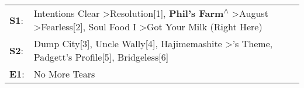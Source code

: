\begin{supertabular}{p{0.03\textwidth}p{0.92\textwidth}}
 \textbf{S1}:  &  Intentions Clear\textsuperscript{} \textgreater \enspace Resolution[1]\textsuperscript{}, \enspace \textbf{Phil's Farm\textsuperscript{$\wedge$}} \textgreater \enspace August\textsuperscript{} \textgreater \enspace Fearless[2]\textsuperscript{}, \enspace Soul Food I\textsuperscript{} \textgreater \enspace Got Your Milk (Right Here)\textsuperscript{}  \enspace  \\
 \textbf{S2}:  &                                                                                                Dump City[3]\textsuperscript{}, \enspace Uncle Wally[4]\textsuperscript{}, \enspace Hajimemashite\textsuperscript{} \textgreater {}'s Theme\textsuperscript{}, \enspace Padgett's Profile[5]\textsuperscript{}, \enspace Bridgeless[6]\textsuperscript{}  \enspace  \\
 \textbf{E1}:  &                                                                                                                                                                                                                                                                                                                                  No More Tears\textsuperscript{}  \enspace  \\
\end{supertabular}
